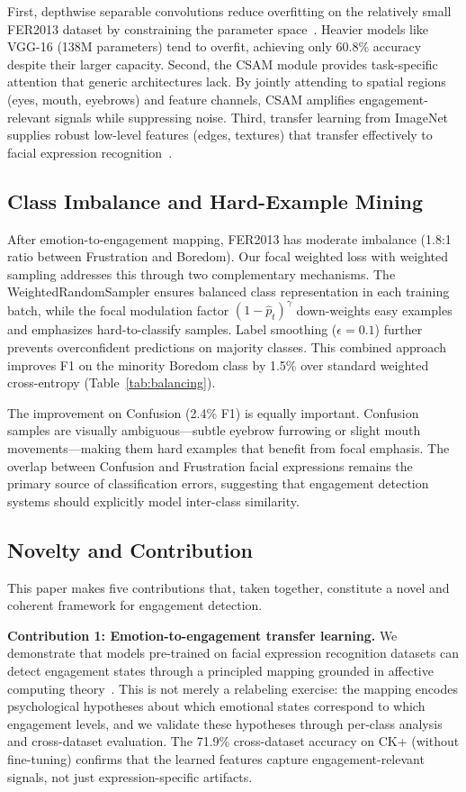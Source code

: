 \documentclass[sensors,article,submit,pdftex,moreauthors]{Definitions/mdpi}
\begin{document}
First, depthwise separable convolutions reduce overfitting on the relatively small FER2013 dataset by constraining the parameter space~\cite{howard2017mobilenets}. Heavier models like VGG-16 (138M parameters) tend to overfit, achieving only 60.8\% accuracy despite their larger capacity. Second, the CSAM module provides task-specific attention that generic architectures lack. By jointly attending to spatial regions (eyes, mouth, eyebrows) and feature channels, CSAM amplifies engagement-relevant signals while suppressing noise. Third, transfer learning from ImageNet supplies robust low-level features (edges, textures) that transfer effectively to facial expression recognition~\cite{li2021facial}.

\subsection{Class Imbalance and Hard-Example Mining}

After emotion-to-engagement mapping, FER2013 has moderate imbalance (1.8:1 ratio between Frustration and Boredom). Our focal weighted loss with weighted sampling addresses this through two complementary mechanisms. The WeightedRandomSampler ensures balanced class representation in each training batch, while the focal modulation factor $(1-\hat{p}_t)^\gamma$ down-weights easy examples and emphasizes hard-to-classify samples. Label smoothing ($\epsilon=0.1$) further prevents overconfident predictions on majority classes. This combined approach improves F1 on the minority Boredom class by 1.5\% over standard weighted cross-entropy (Table~\ref{tab:balancing}).

The improvement on Confusion (2.4\% F1) is equally important. Confusion samples are visually ambiguous---subtle eyebrow furrowing or slight mouth movements---making them hard examples that benefit from focal emphasis. The overlap between Confusion and Frustration facial expressions remains the primary source of classification errors, suggesting that engagement detection systems should explicitly model inter-class similarity.

\subsection{Novelty and Contribution}

This paper makes five contributions that, taken together, constitute a novel and coherent framework for engagement detection.

\textbf{Contribution 1: Emotion-to-engagement transfer learning.}
We demonstrate that models pre-trained on facial expression recognition datasets can detect engagement states through a principled mapping grounded in affective computing theory~\cite{fredricks2004school}. This is not merely a relabeling exercise: the mapping encodes psychological hypotheses about which emotional states correspond to which engagement levels, and we validate these hypotheses through per-class analysis and cross-dataset evaluation. The 71.9\% cross-dataset accuracy on CK+ (without fine-tuning) confirms that the learned features capture engagement-relevant signals, not just expression-specific artifacts.
\end{document}
